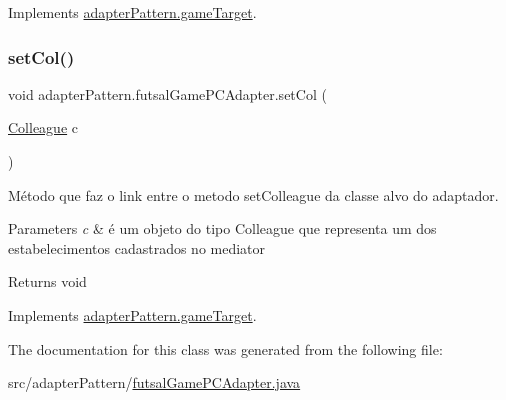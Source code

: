 Implements \mbox{\hyperlink{interfaceadapter_pattern_1_1game_target_a9ea61c0d011aa457f9a8c887d086044a}{adapter\+Pattern.\+game\+Target}}.

\mbox{\label{classadapter_pattern_1_1futsal_game_p_c_adapter_a4a2771736086916d3dc766e417a7913a}} 
\subsubsection{\texorpdfstring{setCol()}{setCol()}}
{\footnotesize\ttfamily void adapter\+Pattern.\+futsal\+Game\+P\+C\+Adapter.\+set\+Col (\begin{DoxyParamCaption}\item[{\mbox{\hyperlink{classmediator_pattern_1_1_colleague}{Colleague}}}]{c }\end{DoxyParamCaption})}



Método que faz o link entre o metodo set\+Colleague da classe alvo do adaptador. 


\begin{DoxyParams}{Parameters}
{\em c} & é um objeto do tipo Colleague que representa um dos estabelecimentos cadastrados no mediator \\
\hline
\end{DoxyParams}
\begin{DoxyReturn}{Returns}
void 
\end{DoxyReturn}


Implements \mbox{\hyperlink{interfaceadapter_pattern_1_1game_target_ae4493af8f85c0459e4e628ffff3fe3b9}{adapter\+Pattern.\+game\+Target}}.



The documentation for this class was generated from the following file\+:\begin{DoxyCompactItemize}
\item 
src/adapter\+Pattern/\mbox{\hyperlink{futsal_game_p_c_adapter_8java}{futsal\+Game\+P\+C\+Adapter.\+java}}\end{DoxyCompactItemize}
